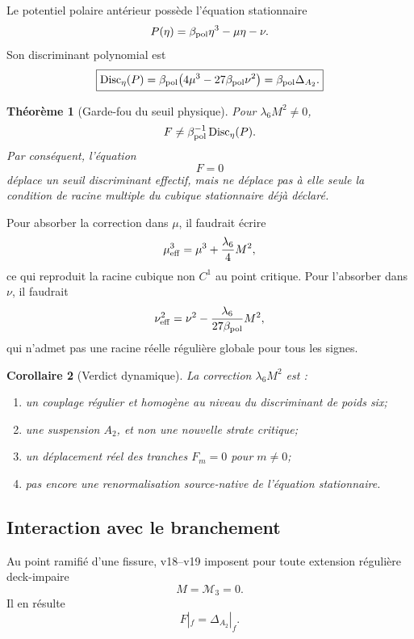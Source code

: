 \documentclass[11pt,a4paper]{article}
\newtheorem{theorem}{Théorème}[section]
\newtheorem{corollary}[theorem]{Corollaire}
\begin{document}
Le potentiel polaire antérieur possède l'équation stationnaire
\[
 P(\eta)
 =
 \beta_{\rm pol}\eta^3-\mu\eta-\nu.
\]
Son discriminant polynomial est
\begin{equation}\label{eq:v21-stationary-disc}
 \boxed{
 \operatorname{Disc}_\eta(P)
 =
 \beta_{\rm pol}
 \bigl(
 4\mu^3-27\beta_{\rm pol}\nu^2
 \bigr)
 =
 \beta_{\rm pol}\Delta_{A_2}.}
\end{equation}

\begin{theorem}[Garde-fou du seuil physique]\label{thm:v21-physical-threshold-guard}
Pour $\lambda_6M^2\neq0$,
\[
 F
 \neq
 \beta_{\rm pol}^{-1}\operatorname{Disc}_\eta(P).
\]
Par conséquent, l'équation
\[
 F=0
\]
déplace un \emph{seuil discriminant effectif}, mais ne déplace pas à elle seule la condition de racine multiple du cubique stationnaire déjà déclaré.
\end{theorem}

Pour absorber la correction dans $\mu$, il faudrait écrire
\[
 \mu_{\rm eff}^3
 =
 \mu^3+\frac{\lambda_6}{4}M^2,
\]
ce qui reproduit la racine cubique non $C^1$ au point critique. Pour l'absorber dans $\nu$, il faudrait
\[
 \nu_{\rm eff}^2
 =
 \nu^2-\frac{\lambda_6}{27\beta_{\rm pol}}M^2,
\]
qui n'admet pas une racine réelle régulière globale pour tous les signes.

\begin{corollary}[Verdict dynamique]\label{cor:v21-dynamic-verdict}
La correction $\lambda_6M^2$ est :
\begin{enumerate}[label=\textup{(\roman*)}]
\item un couplage régulier et homogène au niveau du discriminant de poids six;
\item une suspension $A_2$, et non une nouvelle strate critique;
\item un déplacement réel des tranches $F_m=0$ pour $m\neq0$;
\item \emph{pas encore} une renormalisation source-native de l'équation stationnaire.
\end{enumerate}
\end{corollary}

\subsection{Interaction avec le branchement}

Au point ramifié d'une fissure, v18--v19 imposent pour toute extension régulière deck-impaire
\[
 M=\mathcal M_3=0.
\]
Il en résulte
\[
 \boxed{
 F|_{f}
 =
 \Delta_{A_2}|_{f}.}
\]
\end{document}
